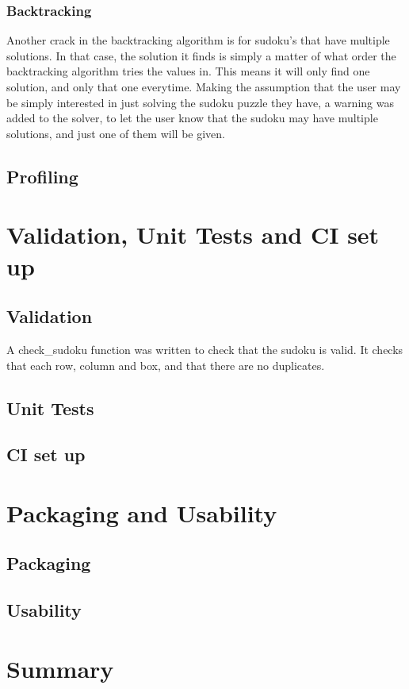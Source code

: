 \documentclass[12pt]{report} %
\begin{document}
\subsection{Backtracking}

Another crack in the backtracking algorithm is for sudoku's that have multiple solutions. In that case, the solution it finds is simply a matter of what order the backtracking algorithm tries the values in. This means it will only find one solution, and only that one everytime. Making the assumption that the user may be simply interested in just solving the sudoku puzzle they have, a warning was added to the solver, to let the user know that the sudoku may have multiple solutions, and just one of them will be given.

\section{Profiling}



\chapter{Validation, Unit Tests and CI set up}

\section{Validation}

A check\_sudoku function was written to check that the sudoku is valid. It checks that each row, column and box, and that there are no duplicates.

\section{Unit Tests}

\section{CI set up}

\chapter{Packaging and Usability}

\section{Packaging}

\section{Usability}


\chapter{Summary}



\end{document}
